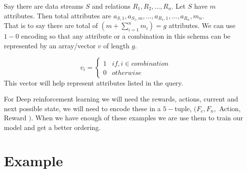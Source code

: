 
\par Say there are data streams $S$ and relations $R_1,R_2,...,R_{n}$. Let $S$ have $m$ attributes. Then total attributes are $a_{S,1}, a_{S_1,m},..., a_{R_{1},1},..., a_{R_n},m_n$. 
\\ That is to say there are total of $(m + \sum_{i=1}^{n}m_i)=g$ attributes. We can use $1-0$ encoding so that any attribute or a combination in this schema can be represented by an array/vector $v$ of length $g$. 

\[ 
   v_i=
   \begin{cases} 
      1 & if, i \in combination \\
      0 & otherwise 
   \end{cases}
\] 
This vector will help represent attributes listed in the query.
\par For Deep reinforcement learning we will need the rewards, actions, current and next possible state, we will need to encode these in a $5-$tuple, $(F_c,F_n,$ Action, Reward $)$. When we have enough of these examples we are use them to train our model and get a better ordering.

\section{Example}

